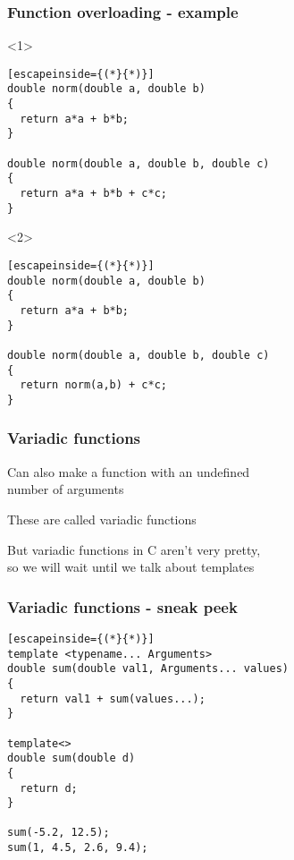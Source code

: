 \documentclass[14pt,a4paper,dvipsnames,usenames]{beamer}
\begin{document}
\begin{frame}[fragile]
  \frametitle{Function overloading - example}

  \begin{onlyenv}<1>
  \begin{lstlisting}[escapeinside={(*}{*)}]
double norm(double a, double b)
{
  return a*a + b*b;
}

double norm(double a, double b, double c)
{
  return a*a + b*b + c*c;
}
  \end{lstlisting}
  \end{onlyenv}

  \begin{onlyenv}<2>
  \begin{lstlisting}[escapeinside={(*}{*)}]
double norm(double a, double b)
{
  return a*a + b*b;
}

double norm(double a, double b, double c)
{
  return norm(a,b) + c*c;
}
  \end{lstlisting}
  \end{onlyenv}
  
\end{frame}

\begin{frame}[fragile]
  \frametitle{Variadic functions}

  Can also make a function with an undefined\\number of arguments

  \vspace{1em}
  These are called {\color{Tropiteal}variadic} functions

  \vspace{1em}
  But variadic functions in C aren't very pretty,\\so we will wait until we talk about templates

\end{frame}

\begin{frame}[fragile]
  \frametitle{Variadic functions - sneak peek}

  \begin{lstlisting}[escapeinside={(*}{*)}]
template <typename... Arguments>
double sum(double val1, Arguments... values)
{
  return val1 + sum(values...);
}

template<>
double sum(double d)
{
  return d;
}

sum(-5.2, 12.5);
sum(1, 4.5, 2.6, 9.4);
  \end{lstlisting}

  \CPPEleven

\end{frame}
\end{document}

